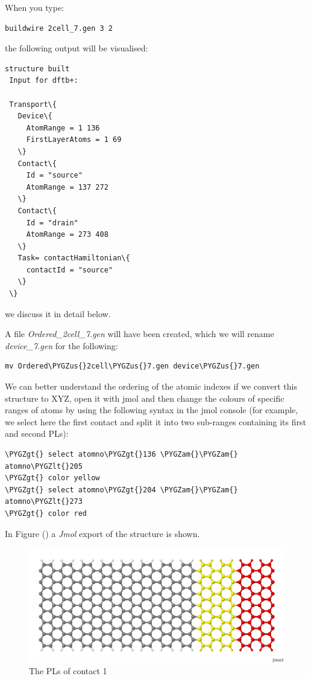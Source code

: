 \documentclass[a4paper,11pt,english]{sphinxmanual}
\def\PYGZus{\char`\_}
\def\PYGZam{\char`\&}
\def\PYGZlt{\char`\<}
\def\PYGZgt{\char`\>}
\begin{document}
{{When you type:
%
\begin{Verbatim}[commandchars=\\\{\}]
  buildwire 2cell_7.gen 3 2
\end{Verbatim}
%
the following output will be visualised:
%
\begin{Verbatim}[commandchars=\\\{\}]
 structure built
 Input for dftb+:

 Transport\{
   Device\{
     AtomRange = 1 136
     FirstLayerAtoms = 1 69
   \}
   Contact\{
     Id = "source"
     AtomRange = 137 272
   \}
   Contact\{
     Id = "drain"
     AtomRange = 273 408
   \}
   Task= contactHamiltonian\{
     contactId = "source"
   \}
 \}  
\end{Verbatim}
%
we discuss it in detail below.

A file \emph{Ordered\_2cell\_7.gen} will have been created, which we will rename \emph{device\_7.gen} for the following:
%
\begin{Verbatim}[commandchars=\\\{\}]
mv Ordered\PYGZus{}2cell\PYGZus{}7.gen device\PYGZus{}7.gen
\end{Verbatim}

We can better
understand the ordering of the atomic indexes if we convert this
structure to XYZ, open it with jmol and then change the colours of
specific ranges of atoms by using the following syntax in the jmol
console (for example, we select here the first contact and split it
into two sub-ranges containing its first and second PLs):

\begin{Verbatim}[commandchars=\\\{\}]
\PYGZgt{} select atomno\PYGZgt{}136 \PYGZam{}\PYGZam{} atomno\PYGZlt{}205
\PYGZgt{} color yellow
\PYGZgt{} select atomno\PYGZgt{}204 \PYGZam{}\PYGZam{} atomno\PYGZlt{}273
\PYGZgt{} color red
\end{Verbatim}

In Figure {\hyperref[transport:fig-color-device-7]{\emph{}}} () a \emph{Jmol} export of the structure is shown.
\begin{figure}[htbp]
\centering
\capstart

\includegraphics[width=0.800\linewidth]{color_device_7.png}
\caption{The PLs of contact 1}\label{transport:fig-color-device-7}\end{figure}

}}
\end{document}
